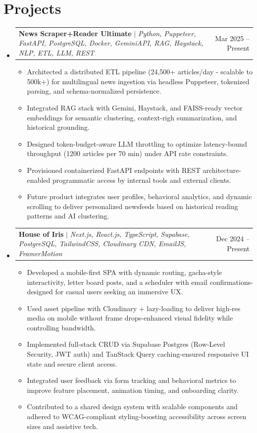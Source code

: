 \documentclass[letterpaper,10pt]{article}
\makeatletter
\newcommand{\resumeItem}[1]{
  \item\small{ {#1 \vspace{-5pt}} } %
}
\newcommand{\resumeProjectHeading}[2]{
  \vspace{-2pt}\item %
  \begin{tabular*}{0.97\textwidth}{l@{\extracolsep{\fill}}r}
    \small#1 & \small #2 \\
  \end{tabular*}\vspace{-8pt} %
}
\newcommand{\resumeItemListStart}{\begin{itemize}}
\newcommand{\resumeItemListEnd}{\end{itemize}\vspace{-2pt}} %
\newcommand{\resumeSubHeadingListStart}{\begin{itemize}[leftmargin=0.15in, label={}]}
\newcommand{\resumeSubHeadingListEnd}{\end{itemize}}
\makeatother
\begin{document}
\section{Projects}
\resumeSubHeadingListStart %
    \resumeProjectHeading
      {\textbf{News Scraper+Reader Ultimate} $|$ \emph{Python, Puppeteer, FastAPI, PostgreSQL, Docker, GeminiAPI, RAG, Haystack, NLP, ETL, LLM, REST}}{Mar 2025 – Present}
      \resumeItemListStart
        \resumeItem{Architected a distributed ETL pipeline (24,500+ articles/day - scalable to 500k+) for multilingual news ingestion via headless Puppeteer, tokenized parsing, and schema-normalized persistence.} 
        \resumeItem{Integrated RAG stack with Gemini, Haystack, and FAISS-ready vector embeddings for semantic clustering, context-righ summarization, and historical grounding.} 
        \resumeItem{Designed token-budget-aware LLM throttling to optimize latency-bound throughput (1200 articles per 70 min) under API rate constraints.} 
        \resumeItem{Provisioned containerized FastAPI endpoints with REST architecture-enabled programmatic access by internal tools and external clients.} 
        \resumeItem{Future product integrates user profiles, behavioral analytics, and dynamic scrolling to deliver personalized newsfeeds based on historical reading patterns and AI clustering.} 
      \resumeItemListEnd

    \resumeProjectHeading
      {\textbf{House of Iris} $|$ \emph{Next.js, React.js, TypeScript, Supabase, PostgreSQL, TailwindCSS, Cloudinary CDN, EmailJS, FramerMotion}}{Dec 2024 – Present}
      \resumeItemListStart
        \resumeItem{Developed a mobile-first SPA with dynamic routing, gacha-style interactivity, letter board posts, and a scheduler with email confirmations-designed for casual users seeking an immersive UX.} 
        \resumeItem{Used asset pipeline with Cloudinary + lazy-loading to deliver high-res media on mobile without frame drops-enhanced visual fidelity while controlling bandwidth.}
        \resumeItem{Implemented full-stack CRUD via Supabase Postgres (Row-Level Security, JWT auth) and TanStack Query caching-ensured responsive UI state and secure client access.}
        \resumeItem{Integrated user feedback via form tracking and behavioral metrics to improve feature placement, animation timing, and onboarding clarity.}
        \resumeItem{Contributed to a shared design system with scalable components and adhered to WCAG-compliant styling-boosting accessibility across screen sizes and assistive tech.} 
      \resumeItemListEnd
\resumeSubHeadingListEnd

\end{document}
